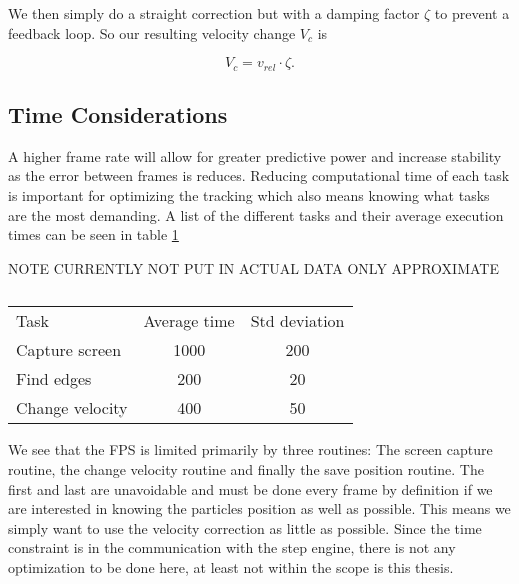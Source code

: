 We then simply do a straight correction but with a damping factor $\zeta$ to prevent a feedback loop. So our resulting velocity change $V_c$ is 

\begin{equation}
V_c = v_{rel}\cdot \zeta.
\end{equation}

\subsection{Time Considerations}\label{sec:time considerations}
A higher frame rate will allow for greater predictive power and increase stability as the error between frames is 
reduces. Reducing computational time of each task is important for optimizing the tracking which also means knowing 
what tasks are the most demanding. A list of the different tasks and their average execution times can be seen in table 
\ref{tab:benchmarks}

NOTE CURRENTLY NOT PUT IN ACTUAL DATA ONLY APPROXIMATE
\begin{table}[H]
 \begin{tabular}{l | c | c } 
 Task  			&  Average time & Std deviation \\
 Capture screen & 1000 			& 200 \\
 Find edges 	& 200			& 20 \\
 Change velocity& 400			& 50 \\
 \end{tabular}
 \caption{}
 \label{tab:benchmarks}
\end{table}

We see that the FPS is limited primarily by three routines: The screen capture routine, the change velocity routine and finally the save position routine. The first and last are unavoidable and must be done every frame by definition if we are interested in knowing the particles position as well as possible. This means we simply want to use the velocity correction as little as possible. Since the time constraint is in the communication with the step engine, there is not any optimization to be done here, at least not within the scope is this thesis. 

